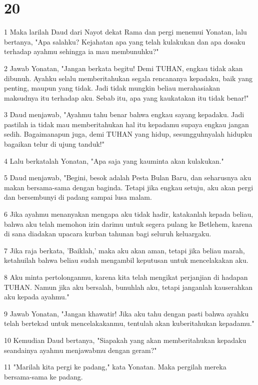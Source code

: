 \chapter{20}

\par 1 Maka larilah Daud dari Nayot dekat Rama dan pergi menemui Yonatan, lalu bertanya, "Apa salahku? Kejahatan apa yang telah kulakukan dan apa dosaku terhadap ayahmu sehingga ia mau membunuhku?"
\par 2 Jawab Yonatan, "Jangan berkata begitu! Demi TUHAN, engkau tidak akan dibunuh. Ayahku selalu memberitahukan segala rencananya kepadaku, baik yang penting, maupun yang tidak. Jadi tidak mungkin beliau merahasiakan maksudnya itu terhadap aku. Sebab itu, apa yang kaukatakan itu tidak benar!"
\par 3 Daud menjawab, "Ayahmu tahu benar bahwa engkau sayang kepadaku. Jadi pastilah ia tidak mau memberitahukan hal itu kepadamu supaya engkau jangan sedih. Bagaimanapun juga, demi TUHAN yang hidup, sesungguhnyalah hidupku bagaikan telur di ujung tanduk!"
\par 4 Lalu berkatalah Yonatan, "Apa saja yang kauminta akan kulakukan."
\par 5 Daud menjawab, "Begini, besok adalah Pesta Bulan Baru, dan seharusnya aku makan bersama-sama dengan baginda. Tetapi jika engkau setuju, aku akan pergi dan bersembunyi di padang sampai lusa malam.
\par 6 Jika ayahmu menanyakan mengapa aku tidak hadir, katakanlah kepada beliau, bahwa aku telah memohon izin darimu untuk segera pulang ke Betlehem, karena di sana diadakan upacara kurban tahunan bagi seluruh keluargaku.
\par 7 Jika raja berkata, 'Baiklah,' maka aku akan aman, tetapi jika beliau marah, ketahuilah bahwa beliau sudah mengambil keputusan untuk mencelakakan aku.
\par 8 Aku minta pertolonganmu, karena kita telah mengikat perjanjian di hadapan TUHAN. Namun jika aku bersalah, bunuhlah aku, tetapi janganlah kauserahkan aku kepada ayahmu."
\par 9 Jawab Yonatan, "Jangan khawatir! Jika aku tahu dengan pasti bahwa ayahku telah bertekad untuk mencelakakanmu, tentulah akan kuberitahukan kepadamu."
\par 10 Kemudian Daud bertanya, "Siapakah yang akan memberitahukan kepadaku seandainya ayahmu menjawabmu dengan geram?"
\par 11 "Marilah kita pergi ke padang," kata Yonatan. Maka pergilah mereka bersama-sama ke padang.
